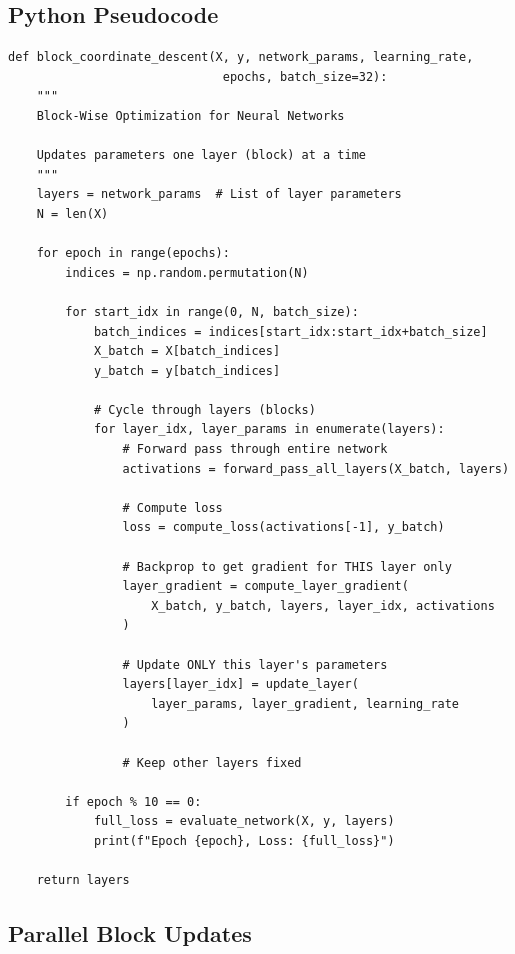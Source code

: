 \documentclass{tufte-handout}
\begin{document}
\subsection{Python Pseudocode}

\begin{lstlisting}
def block_coordinate_descent(X, y, network_params, learning_rate, 
                              epochs, batch_size=32):
    """
    Block-Wise Optimization for Neural Networks
    
    Updates parameters one layer (block) at a time
    """
    layers = network_params  # List of layer parameters
    N = len(X)
    
    for epoch in range(epochs):
        indices = np.random.permutation(N)
        
        for start_idx in range(0, N, batch_size):
            batch_indices = indices[start_idx:start_idx+batch_size]
            X_batch = X[batch_indices]
            y_batch = y[batch_indices]
            
            # Cycle through layers (blocks)
            for layer_idx, layer_params in enumerate(layers):
                # Forward pass through entire network
                activations = forward_pass_all_layers(X_batch, layers)
                
                # Compute loss
                loss = compute_loss(activations[-1], y_batch)
                
                # Backprop to get gradient for THIS layer only
                layer_gradient = compute_layer_gradient(
                    X_batch, y_batch, layers, layer_idx, activations
                )
                
                # Update ONLY this layer's parameters
                layers[layer_idx] = update_layer(
                    layer_params, layer_gradient, learning_rate
                )
                
                # Keep other layers fixed
        
        if epoch % 10 == 0:
            full_loss = evaluate_network(X, y, layers)
            print(f"Epoch {epoch}, Loss: {full_loss}")
    
    return layers
\end{lstlisting}

\subsection{Parallel Block Updates}
\end{document}
